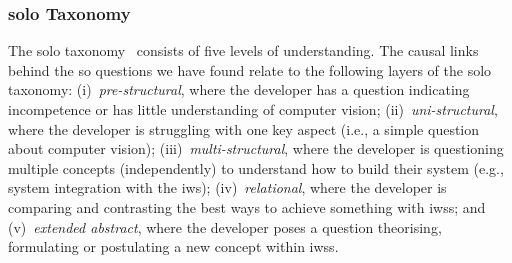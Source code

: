 \subsubsection{\gls{solo} Taxonomy}

The \gls{solo} taxonomy~\citep{Biggs:2014ur} consists of five levels of understanding. The causal links behind the \gls{so} questions we have found relate to the following layers of the \gls{solo} taxonomy:
%
(i)~\textit{pre-structural}, where the developer has a question indicating incompetence or has little understanding of computer vision;
%
(ii)~\textit{uni-structural}, where the developer is struggling with one key aspect (i.e., a simple question about computer vision);
%
(iii)~\textit{multi-structural}, where the developer is questioning multiple concepts (independently) to understand how to build their system (e.g., system integration with the \gls{iws});
%
(iv)~\textit{relational}, where the developer is comparing and contrasting the best ways to achieve something with \glspl{iws}; and
%
(v)~\textit{extended abstract}, where the developer poses a question theorising, formulating or postulating a new concept within \glspl{iws}.

